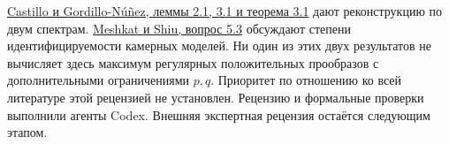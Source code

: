 \documentclass[12pt,a4paper]{article}
\begin{document}
\href{https://arxiv.org/html/2602.20894v1#S3.Thmtheorem1}{Castillo и Gordillo-Núñez, леммы 2.1, 3.1 и теорема 3.1} дают реконструкцию по двум спектрам. \href{https://arxiv.org/html/2507.04496v1#S5}{Meshkat и Shiu, вопрос 5.3} обсуждают степени идентифицируемости камерных моделей. Ни один из этих двух результатов не вычисляет здесь максимум регулярных положительных прообразов с дополнительными ограничениями \(p,q\). Приоритет по отношению ко всей литературе этой рецензией не установлен. Рецензию и формальные проверки выполнили агенты Codex. Внешняя экспертная рецензия остаётся следующим этапом.
\end{document}
